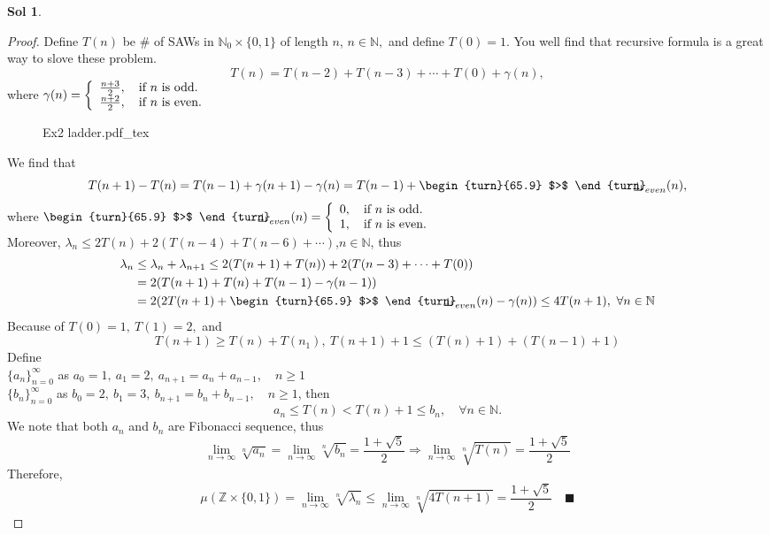 \documentclass[12pt,a4paper]{report}
\theoremstyle{definition}
\newtheorem*{sol}{Sol}
\newcommand{\indecate}{\mbox{\begin{turn}{65.9}
$>$
\end{turn}\hspace{-10.5pt}\parbox[t][-5pt][c]{10pt}{$\bot$}\hspace{-4.35pt}\parbox[t][-3.4pt][c]{4pt}{$\shortmid$}}}
\newcommand{\incfig}[1]{%
{#1.pdf_tex}
}
\begin{document}
\begin{sol}
		\begin{proof}
		Define $T(n)$ be \# of SAWs in $\mathbb{N}_0\times \{0,1\}$ of length $n$, $n\in \mathbb{N},$ and define $T(0)=1.$ You well find that recursive formula is a great way to slove these problem.
		\[
		T(n)=T(n-2)+T(n-3)+\cdots +T(0)+\gamma(n), 
		\]
		where $ \gamma(n)=\bigg\{\begin{array}[c]{l}
		\frac{n+3}{2},\quad \mbox{if } n \mbox{ is odd.}\\
		\frac{n+2}{2},\quad \mbox{if }n \mbox{ is even.}
		\end{array} $
		\begin{figure}[htp]
		\centering
		\def\svgwidth{10cm}
		\incfig{Ex2 ladder}
		\end{figure}
		We find that 
		\[
		T(n+1)-T(n)=T(n-1)+\gamma(n+1)-\gamma(n)=T(n-1)+\indecate_{even}(n),
		\]
		where $\indecate_{even}(n)=\bigg\{\begin{array}[c]{l}
		0,\quad \mbox{if } n \mbox{ is odd.}\\
		1,\quad \mbox{if }n \mbox{ is even.}
		\end{array}$\\[3pt]
		Moreover, $\lambda_n\leq 2T(n)+2(T(n-4)+T(n-6)+\cdots )$,\quad $n\in\mathbb{N}$, thus
		\begin{align*}
		    \lambda_n&\leq\lambda_n+\lambda_{n+1}\leq 2(T(n+1)+T(n))+2(T(n-3)+\cdots +T(0))\\
		    &=2(T(n+1)+T(n)+T(n-1)-\gamma(n-1))\\
		    &=2(2T(n+1)+\indecate_{even}(n)-\gamma(n))\leq 4T(n+1),\ \forall n\in\mathbb{N}
		\end{align*}
		Because of $T(0)=1,\ T(1)=2,$ and 
		\[ 
		T(n+1)\geq T(n)+T(n_1),\ T(n+1)+1\leq (T(n)+1)+(T(n-1)+1)
		\]
		Define\\
		$\{a_n\}_{n=0}^\infty$ as $a_0=1,\ a_1=2,\ a_{n+1}=a_n+a_{n-1},\quad n\geq 1$\\
		$\{b_n\}_{n=0}^\infty$ as $b_0=2,\ b_1=3,\ b_{n+1}=b_n+b_{n-1},\quad n\geq 1$, then 
		\[
		a_n\leq T(n)<T(n)+1\leq b_n,\quad \forall n\in\mathbb{N}.
		\]
		We note that both $a_n$ and $b_n$ are Fibonacci sequence, thus
		\[
		\lim_{n\to\infty}\sqrt[n]{a_n}=\lim_{n\to\infty}\sqrt[n]{b_n}=\frac{1+\sqrt{5}}{2}\Rightarrow \lim_{n\to\infty}\sqrt[n]{T(n)}=\frac{1+\sqrt{5}}{2}
		\]
		Therefore,
		\[
		\mu(\mathbb{Z}\times \{0,1\})=\lim_{n\to\infty}\sqrt[n]{\lambda_n}\leq \lim_{n\to\infty}\sqrt[n]{4T(n+1)}=\frac{1+\sqrt{5}}{2}\quad \blacksquare
		\]
		\end{proof}
\end{sol}
\end{document}
